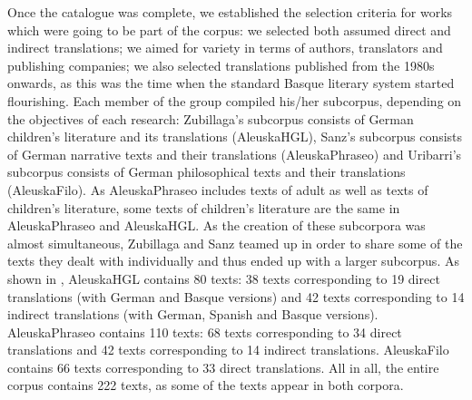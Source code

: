 \documentclass[output=paper]{LSP/langsci}
\begin{document}
Once the catalogue was complete, we established the selection criteria for works which were going to be part of the corpus: we selected both assumed direct and indirect translations; we aimed for variety in terms of authors, translators and publishing companies; we also selected translations published from the 1980s onwards, as this was the time when the standard Basque literary system started flourishing. Each member of the group compiled his/her subcorpus, depending on the objectives of each research: Zubillaga's subcorpus consists of German children's literature and its translations (AleuskaHGL), Sanz's subcorpus consists of German narrative texts and their translations (AleuskaPhraseo) and Uribarri's subcorpus consists of German philosophical texts and their translations (AleuskaFilo). As AleuskaPhraseo includes texts of adult as well as texts of children's literature, some texts of children's literature are the same in AleuskaPhraseo and AleuskaHGL. As the creation of these subcorpora was almost simultaneous, Zubillaga and Sanz teamed up in order to share some of the texts they dealt with individually and thus ended up with a larger subcorpus. As shown in , AleuskaHGL contains 80 texts: 38 texts corresponding to 19 direct translations (with German and Basque versions) and 42 texts corresponding to 14 indirect translations (with German, Spanish and Basque versions). AleuskaPhraseo contains 110 texts: 68 texts corresponding to 34 direct translations and 42 texts corresponding to 14 indirect translations. AleuskaFilo contains 66 texts corresponding to 33 direct translations. All in all, the entire corpus contains 222 texts, as some of the texts appear in both corpora.

\begin{table}
     \centering
 \caption{Number and type of texts in the corpus}
     \label{tab:3.2}
\end{table}
\end{document}

